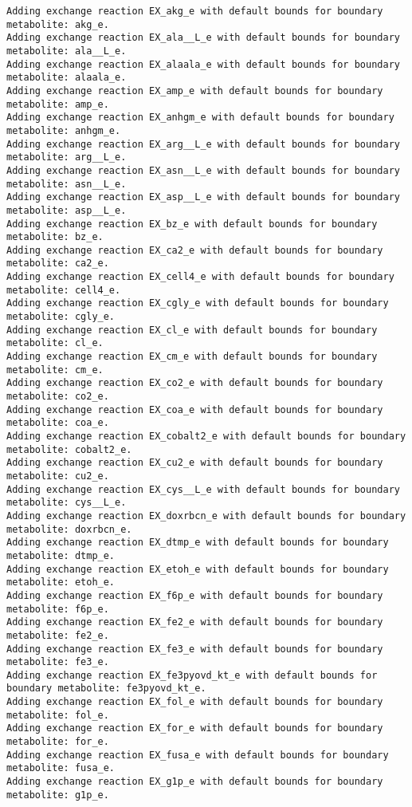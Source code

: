 \documentclass[
  letterpaper,
  DIV=11,
  numbers=noendperiod]{scrartcl}
\begin{document}
\begin{verbatim}
Adding exchange reaction EX_akg_e with default bounds for boundary metabolite: akg_e.
Adding exchange reaction EX_ala__L_e with default bounds for boundary metabolite: ala__L_e.
Adding exchange reaction EX_alaala_e with default bounds for boundary metabolite: alaala_e.
Adding exchange reaction EX_amp_e with default bounds for boundary metabolite: amp_e.
Adding exchange reaction EX_anhgm_e with default bounds for boundary metabolite: anhgm_e.
Adding exchange reaction EX_arg__L_e with default bounds for boundary metabolite: arg__L_e.
Adding exchange reaction EX_asn__L_e with default bounds for boundary metabolite: asn__L_e.
Adding exchange reaction EX_asp__L_e with default bounds for boundary metabolite: asp__L_e.
Adding exchange reaction EX_bz_e with default bounds for boundary metabolite: bz_e.
Adding exchange reaction EX_ca2_e with default bounds for boundary metabolite: ca2_e.
Adding exchange reaction EX_cell4_e with default bounds for boundary metabolite: cell4_e.
Adding exchange reaction EX_cgly_e with default bounds for boundary metabolite: cgly_e.
Adding exchange reaction EX_cl_e with default bounds for boundary metabolite: cl_e.
Adding exchange reaction EX_cm_e with default bounds for boundary metabolite: cm_e.
Adding exchange reaction EX_co2_e with default bounds for boundary metabolite: co2_e.
Adding exchange reaction EX_coa_e with default bounds for boundary metabolite: coa_e.
Adding exchange reaction EX_cobalt2_e with default bounds for boundary metabolite: cobalt2_e.
Adding exchange reaction EX_cu2_e with default bounds for boundary metabolite: cu2_e.
Adding exchange reaction EX_cys__L_e with default bounds for boundary metabolite: cys__L_e.
Adding exchange reaction EX_doxrbcn_e with default bounds for boundary metabolite: doxrbcn_e.
Adding exchange reaction EX_dtmp_e with default bounds for boundary metabolite: dtmp_e.
Adding exchange reaction EX_etoh_e with default bounds for boundary metabolite: etoh_e.
Adding exchange reaction EX_f6p_e with default bounds for boundary metabolite: f6p_e.
Adding exchange reaction EX_fe2_e with default bounds for boundary metabolite: fe2_e.
Adding exchange reaction EX_fe3_e with default bounds for boundary metabolite: fe3_e.
Adding exchange reaction EX_fe3pyovd_kt_e with default bounds for boundary metabolite: fe3pyovd_kt_e.
Adding exchange reaction EX_fol_e with default bounds for boundary metabolite: fol_e.
Adding exchange reaction EX_for_e with default bounds for boundary metabolite: for_e.
Adding exchange reaction EX_fusa_e with default bounds for boundary metabolite: fusa_e.
Adding exchange reaction EX_g1p_e with default bounds for boundary metabolite: g1p_e.

\end{verbatim}
\end{document}
